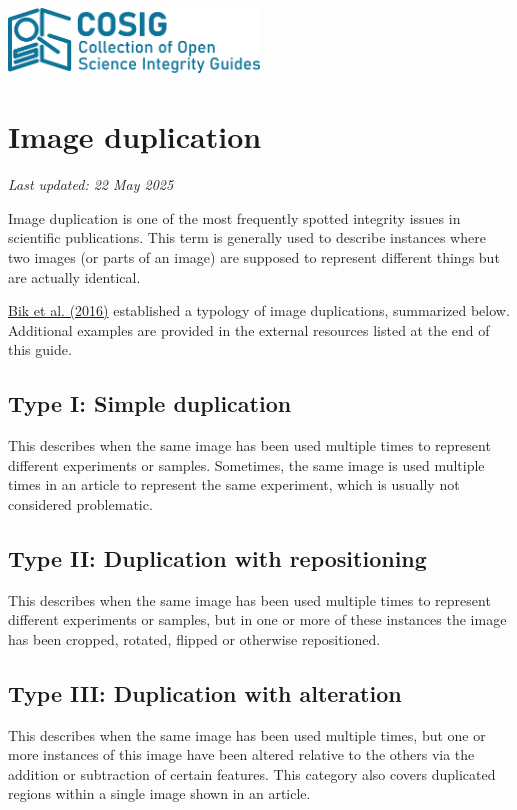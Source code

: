 \documentclass[letterpaper, 12pt]{article}
\begin{document}
\flushleft
\includegraphics[width=0.5\textwidth]{img/home/241017_final_logo_mockup.png}

\section*{Image duplication}
\textit{Last updated: 22 May 2025}

Image duplication is one of the most frequently spotted integrity issues in scientific publications. This term is generally used to describe instances where two images (or parts of an image) are supposed to represent different things but are actually identical.

\href{https://doi.org/10.1128/mbio.00809-16}{Bik et al. (2016)} established a typology of image duplications, summarized below. Additional examples are provided in the external resources listed at the end of this guide.

\subsection*{Type I: Simple duplication}

This describes when the same image has been used multiple times to represent different experiments or samples. Sometimes, the same image is used multiple times in an article to represent the same experiment, which is usually not considered problematic.

\subsection*{Type II: Duplication with repositioning}

This describes when the same image has been used multiple times to represent different experiments or samples, but in one or more of these instances the image has been cropped, rotated, flipped or otherwise repositioned.

\subsection*{Type III: Duplication with alteration} 

This describes when the same image has been used multiple times, but one or more instances of this image have been altered relative to the others via the addition or subtraction of certain features. This category also covers duplicated regions within a single image shown in 
an article.
\end{document}
